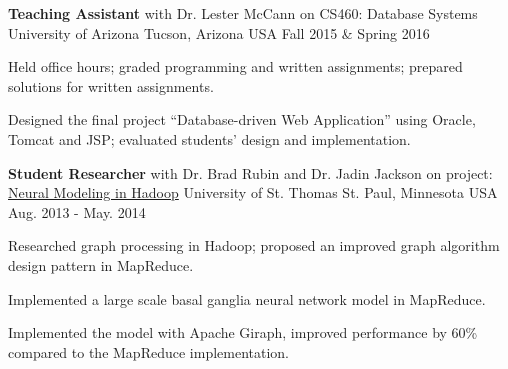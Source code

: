 \begin{cventries}
  \cventry
    {\textbf{Teaching Assistant} with Dr. Lester McCann
    on CS460: Database Systems}
    {University of Arizona} %
    {Tucson, Arizona USA} %
    {Fall 2015 \& Spring 2016} %
    {
      \begin{cvitems} %
        \item {Held office hours; graded programming and written
    assignments; prepared solutions for written assignments.}
        \item {Designed the final project ``Database-driven Web
    Application'' using Oracle, Tomcat and JSP; evaluated
    students' design and implementation.}
      \end{cvitems}
    }

  \cventry
    {\textbf{Student Researcher} with Dr. Brad Rubin and Dr. Jadin
    Jackson on project: \href{http://imsure.github.io/NeuralGiraph/}{Neural
    Modeling in Hadoop}}
    {University of St. Thomas} %
    {St. Paul, Minnesota USA} %
    {Aug. 2013 - May. 2014} %
    {
      \begin{cvitems} %
      \item {Researched graph processing in Hadoop; proposed an
    improved graph algorithm design pattern in MapReduce.}
      \item {Implemented a large scale basal ganglia neural network
    model in MapReduce.}
      \item {Implemented the model
       with Apache Giraph, improved
    performance by 60\% compared to the MapReduce implementation.}
      \end{cvitems}
    }

\end{cventries}
